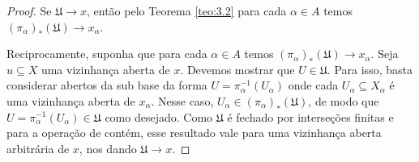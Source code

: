 \begin{proof}
 Se
 $\mathfrak{U} \to x$,
 então pelo Teorema \ref{teo:3.2} para cada
 $\alpha \in A$
 temos
 $(\pi_{\alpha})_*(\mathfrak{U}) \to x_{\alpha}$.
 
 Reciprocamente, suponha que para cada
 $\alpha \in A$
 temos
 $(\pi_{\alpha})_*(\mathfrak{U}) \to x_{\alpha}$.
 Seja
 $u \subseteq X$
 uma vizinhança aberta de
 $x$.
 Devemos mostrar que 
 $U \in \mathfrak{U}.$
 Para isso, basta considerar abertos da sub base da forma
 $U = \pi_{\alpha}^{-1}(U_{\alpha})$
 onde cada
 $U_{\alpha} \subseteq X_{\alpha}$
 é uma vizinhança aberta de
 $x_{\alpha}$.
 Nesse caso,
 $U_{\alpha} \in (\pi_{\alpha})_*(\mathfrak{U})$,
 de modo que
 $U = \pi_{\alpha}^{-1}(U_{\alpha}) \in \mathfrak{U}$
 como desejado.
 Como $\mathfrak{U}$ é fechado por interseções finitas 
 e para a operação de contém, esse resultado vale para
 uma vizinhança aberta arbitrária de
 $x$,
 nos dando
 $\mathfrak{U} \to x$.
 \end{proof}
